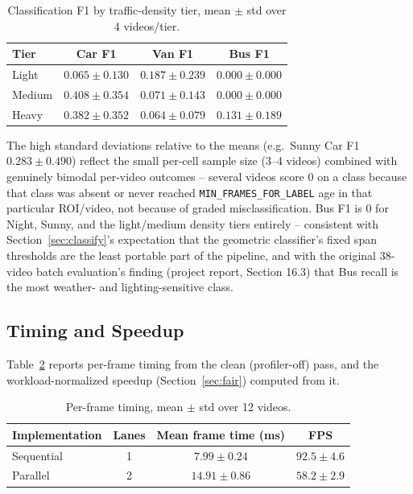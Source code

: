 \documentclass[conference]{IEEEtran}
\newcommand{\code}[1]{\texttt{#1}}
\begin{document}
\begin{table}[t]
\centering
\caption{Classification F1 by traffic-density tier, mean $\pm$ std over
4 videos/tier.}
\label{tab:accuracy-by-tier}
\footnotesize
\begin{tabular}{lccc}
\toprule
\textbf{Tier} & \textbf{Car F1} & \textbf{Van F1} & \textbf{Bus F1} \\
\midrule
Light  & $0.065 \pm 0.130$ & $0.187 \pm 0.239$ & $0.000 \pm 0.000$ \\
Medium & $0.408 \pm 0.354$ & $0.071 \pm 0.143$ & $0.000 \pm 0.000$ \\
Heavy  & $0.382 \pm 0.352$ & $0.064 \pm 0.079$ & $0.131 \pm 0.189$ \\
\bottomrule
\end{tabular}
\end{table}

The high standard deviations relative to the means (e.g.\ Sunny Car F1
$0.283 \pm 0.490$) reflect the small per-cell sample size (3--4 videos)
combined with genuinely bimodal per-video outcomes -- several videos
score 0 on a class because that class was absent or never reached
\code{MIN\_FRAMES\_FOR\_LABEL} age in that particular ROI/video, not
because of graded misclassification. Bus F1 is 0 for Night, Sunny, and
the light/medium density tiers entirely -- consistent with
Section~\ref{sec:classify}'s expectation that the geometric classifier's
fixed span thresholds are the least portable part of the pipeline, and
with the original 38-video batch evaluation's finding (project report,
Section 16.3) that Bus recall is the most weather- and lighting-sensitive
class.

\subsection{Timing and Speedup}
Table~\ref{tab:results-timing} reports per-frame timing from the clean
(profiler-off) pass, and the workload-normalized speedup
(Section~\ref{sec:fair}) computed from it.

\begin{table}[t]
\centering
\caption{Per-frame timing, mean $\pm$ std over 12 videos.}
\label{tab:results-timing}
\footnotesize
\begin{tabular}{lccc}
\toprule
\textbf{Implementation} & \textbf{Lanes} & \textbf{Mean frame time (ms)} & \textbf{FPS} \\
\midrule
Sequential & 1 & $7.99 \pm 0.24$ & $92.5 \pm 4.6$ \\
Parallel   & 2 & $14.91 \pm 0.86$ & $58.2 \pm 2.9$ \\
\bottomrule
\end{tabular}
\end{table}
\end{document}
